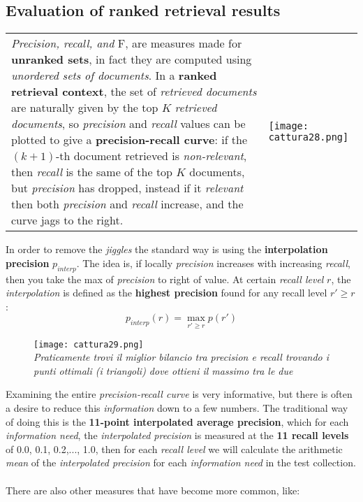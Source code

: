 \documentclass{article}
\begin{document}
\subsection{Evaluation of ranked retrieval results}
\begin{tabular}{L{8cm} C{5.5cm}}
\emph{Precision, recall, and }F, are measures made for \textbf{unranked sets}, in fact they are computed using \emph{unordered sets of documents}. In a \textbf{ranked retrieval context}, the set of \emph{retrieved documents} are naturally given by the top $K$ \emph{retrieved documents}, so \emph{precision} and \emph{recall} values can be plotted to give a \textbf{precision-recall curve}: if the $(k+1)$-th document retrieved is \emph{non-relevant}, then \emph{recall} is the same of the top $K$ documents, but \emph{precision} has dropped, instead if it \emph{relevant} then both \emph{precision} and \emph{recall} increase, and the curve jags to the right. &
  \texttt{[image: cattura28.png]}
\end{tabular}
\clearpage
In order to remove the \emph{jiggles} the standard way is using the \textbf{interpolation precision} $p_{interp}$. The idea is, if locally \emph{precision} increases with increasing \emph{recall}, then you take the max of \emph{precision} to right of value. At certain \emph{recall level} $r$, the \emph{interpolation} is defined as the \textbf{highest precision} found for any recall level $r' \geq r$:
\[p_{interp}(r) = \max_{r'\geq r}p(r') \]
\begin{figure}[H]
  \centering
  \texttt{[image: cattura29.png]}
  \\ \emph{Praticamente trovi il miglior bilancio tra precision e recall trovando i punti ottimali (i triangoli) dove ottieni il massimo tra le due}
\end{figure}
Examining the entire \emph{precision-recall curve} is very informative, but there is often a desire to reduce this \emph{information} down to a few numbers. The traditional way of doing this is the \textbf{11-point interpolated average precision}, which for each \emph{information need}, the \emph{interpolated precision} is measured at the \textbf{11 recall levels} of 0.0, 0.1, 0.2,..., 1.0, then for each \emph{recall level} we will calculate the arithmetic \emph{mean} of the \emph{interpolated precision} for each \emph{information need} in the test collection. \\\\
There are also other measures that have become more common, like:
\end{document}
